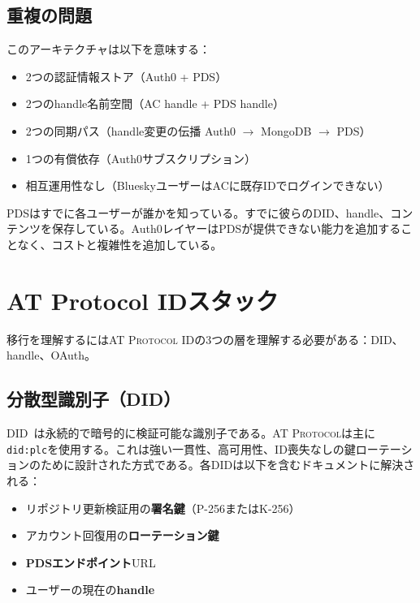 \documentclass[10pt,letterpaper,twocolumn]{article}
\newcommand{\atproto}{\textsc{AT Protocol}}
\begin{document}
\subsection{重複の問題}

このアーキテクチャは以下を意味する：

\begin{itemize}
  \item 2つの認証情報ストア（Auth0 + PDS）
  \item 2つのhandle名前空間（AC handle + PDS handle）
  \item 2つの同期パス（handle変更の伝播 Auth0 $\to$ MongoDB $\to$ PDS）
  \item 1つの有償依存（Auth0サブスクリプション）
  \item 相互運用性なし（BlueskyユーザーはACに既存IDでログインできない）
\end{itemize}

PDSはすでに各ユーザーが誰かを知っている。すでに彼らのDID、handle、コンテンツを保存している。Auth0レイヤーはPDSが提供できない能力を追加することなく、コストと複雑性を追加している。


\section{AT Protocol IDスタック}
\label{sec:atproto}

移行を理解するには\atproto{} IDの3つの層を理解する必要がある：DID、handle、OAuth。

\subsection{分散型識別子（DID）}

DID~\citep{w3cdid2022, atproto2024did}は永続的で暗号的に検証可能な識別子である。\atproto{}は主に\texttt{did:plc}を使用する。これは強い一貫性、高可用性、ID喪失なしの鍵ローテーションのために設計された方式である。各DIDは以下を含むドキュメントに解決される：

\begin{itemize}
  \item リポジトリ更新検証用の\textbf{署名鍵}（P-256またはK-256）~\citep{atproto2024crypto}
  \item アカウント回復用の\textbf{ローテーション鍵}
  \item \textbf{PDSエンドポイント}URL
  \item ユーザーの現在の\textbf{handle}
\end{itemize}
\end{document}
